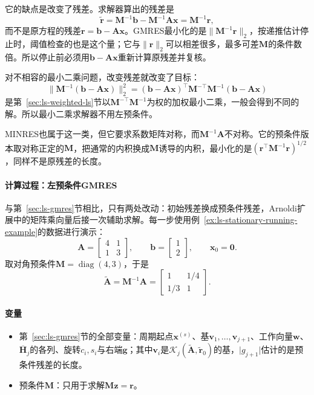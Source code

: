 它的缺点是改变了残差。求解器算出的残差是
\begin{equation}
 \tilde{\bm r}=\bm M^{-1}\bm b-\bm M^{-1}\bm A\bm x=\bm M^{-1}\bm r ,
 \label{eq:ls-left-preconditioned-residual}
\end{equation}
而不是原方程的残差$\bm r=\bm b-\bm A\bm x$。GMRES最小化的是$\lVert\bm M^{-1}\bm r\rVert_2$，按递推估计停止时，阈值检查的也是这个量；它与$\lVert\bm r\rVert_2$可以相差很多，最多可差$\bm M$的条件数倍。所以停止前必须用$\bm b-\bm A\bm x$重新计算原残差并复核。

对不相容的最小二乘问题，改变残差就改变了目标：
\[
 \lVert\bm M^{-1}(\bm b-\bm A\bm x)\rVert_2^2=(\bm b-\bm A\bm x)^\top\bm M^{-\top}\bm M^{-1}(\bm b-\bm A\bm x)
\]
是第~\ref{sec:ls-weighted-ls}节以$\bm M^{-\top}\bm M^{-1}$为权的加权最小二乘，一般会得到不同的解。所以最小二乘求解器不用左预条件。

MINRES也属于这一类，但它要求系数矩阵对称，而$\bm M^{-1}\bm A$不对称。它的预条件版本取对称正定的$\bm M$，把通常的内积换成$\bm M$诱导的内积，最小化的是$(\bm r^\top\bm M^{-1}\bm r)^{1/2}$，同样不是原残差的长度。

\paragraph{计算过程：左预条件GMRES}
与第~\ref{sec:ls-gmres}节相比，只有两处改动：初始残差换成预条件残差，Arnoldi扩展中的矩阵乘向量后接一次辅助求解。每一步使用例~\ref{ex:ls-stationary-running-example}的数据进行演示：
\[
 \bm A=\begin{bmatrix}4&1\\1&3\end{bmatrix},\qquad
 \bm b=\begin{bmatrix}1\\2\end{bmatrix},\qquad
 \bm x_0=\bm 0 .
\]
取对角预条件$\bm M=\operatorname{diag}(4,3)$，于是
\[
 \widetilde{\bm A}=\bm M^{-1}\bm A=\begin{bmatrix}1&1/4\\1/3&1\end{bmatrix}.
\]

\paragraph{变量}
\begin{itemize}
 \item 第~\ref{sec:ls-gmres}节的全部变量：周期起点$\bm x^{(s)}$、基$\bm v_1,\ldots,\bm v_{j+1}$、工作向量$\bm w$、$\overline{\bm H}_j$的各列、旋转$c_i,s_i$与右端$\bm g$；其中$\bm v_i$是$\mathcal K_j(\widetilde{\bm A},\tilde{\bm r}_0)$的基，$\lvert g_{j+1}\rvert$估计的是预条件残差的长度。
 \item 预条件$\bm M$：只用于求解$\bm M\bm z=\bm r$。
\end{itemize}

